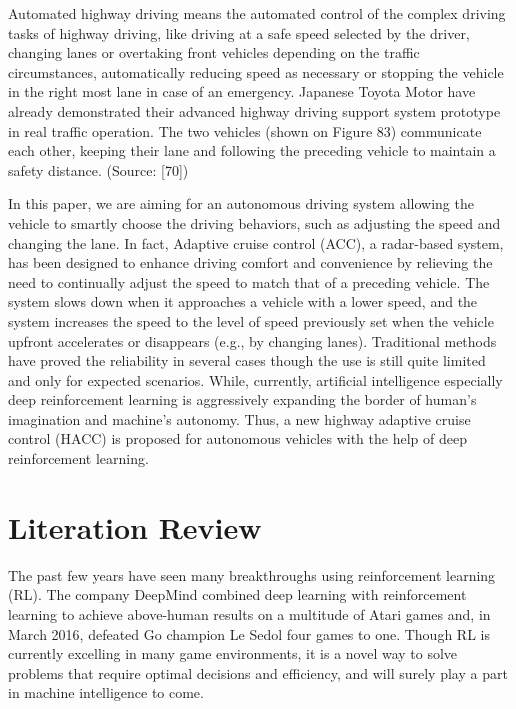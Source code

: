 Automated highway driving means the automated control of the complex driving tasks of highway driving, like driving at a safe speed selected by the driver, changing lanes or overtaking front vehicles depending on the traffic circumstances, automatically reducing speed as necessary or stopping the vehicle in the right most lane in case of an emergency. Japanese Toyota Motor have already demonstrated their advanced highway driving support system prototype in real traffic operation. The two vehicles (shown on Figure 83) communicate each other, keeping their lane and following the preceding vehicle to maintain a safety distance. (Source: [70])




In this paper, we are aiming for an autonomous driving system allowing the vehicle to smartly choose the driving behaviors, such as adjusting the speed and changing the lane. In fact, Adaptive cruise control (ACC), a radar-based system, has been designed to enhance driving comfort and convenience by relieving the need to continually adjust the speed to match that of a preceding vehicle. The system slows down when it approaches a vehicle with a lower speed, and the system increases the speed to the level of speed previously set when the vehicle upfront accelerates or disappears (e.g., by changing lanes). Traditional methods have proved the reliability in several cases though the use is still quite limited and only for expected scenarios. While, currently, artificial intelligence especially deep reinforcement learning is aggressively expanding the border of human's imagination and machine's autonomy. Thus, a new highway adaptive cruise control (HACC) is proposed for autonomous vehicles with the help of deep reinforcement learning.

\section{Literation Review}

The past few years have seen many breakthroughs using reinforcement learning (RL). The company DeepMind combined deep learning with reinforcement learning to achieve above-human results on a multitude of Atari games and, in March 2016, defeated Go champion Le Sedol four games to one. Though RL is currently excelling in many game environments, it is a novel way to solve problems that require optimal decisions and efficiency, and will surely play a part in machine intelligence to come.

